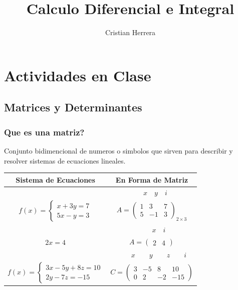 \documentclass[stu, 12pt, letterpaper, donotrepeattitle, floatsintext, natbib]{apa7}
\title{\Large Calculo Diferencial e Integral}
\author{Cristian Herrera}
\affiliation{Instituto Superior Tecnológico Tena}
\begin{document}
\maketitle

\renewcommand\contentsname{\largeÍndice}
\tableofcontents
\setcounter{tocdepth}{6} %
\newpage


\section{Actividades en Clase}
\subsection{Matrices y Determinantes} 

\subsubsection{Que es una matriz?}
Conjunto bidimencional de numeros o simbolos que sirven para describir y resolver sistemas de ecuaciones lineales.
\begin{table}
    \centering
    \begin{tabular}{|c|c|}
        \hline
        Sistema de Ecuaciones & En Forma de Matriz \\ \hline
        & $\quad x\quad y\quad i$ \\ 
        $ f(x) =  \begin{cases} x + 3y = 7 \\ 5x - y = 3  \end{cases} $ 
        & 
        $A = \begin{pmatrix}
            1 & 3 & 7 \\
            5 & -1 & 3
        \end{pmatrix}_{2\times3}$ \\[1cm]\hline
        
        & $\quad\quad\quad x\quad i\quad $ \\
        $2x=4$ & $A = \begin{pmatrix} 2 & 4 \end{pmatrix}$ \\[0.8cm]\hline
        
        & $\quad\quad x\quad\quad y\quad\quad z\quad\quad i$ \\
        $ f(x)=\begin{cases} 3x-5y+8z=10 \\ 2y-7z=-15 \end{cases} $ & 
        $C=\begin{pmatrix}
            3 & -5 & 8 & 10 \\ 
            0 & 2 & -2 & -15
        \end{pmatrix}$ \\[1cm]\hline
    \end{tabular}
\end{table}
\end{document}
